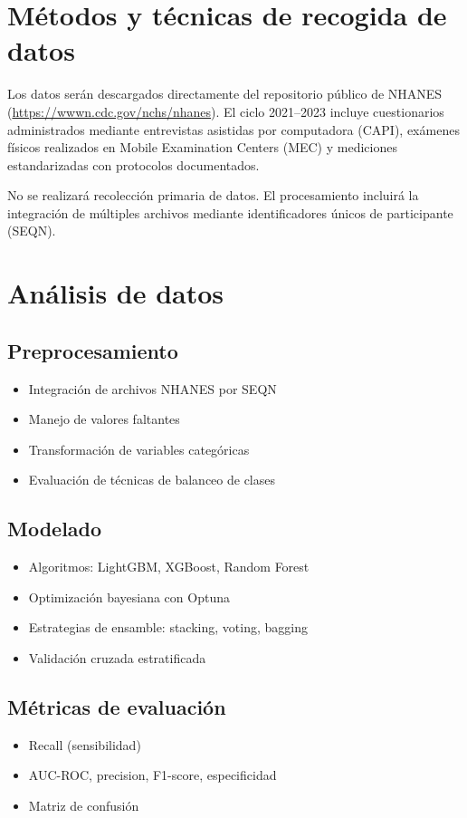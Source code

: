 \documentclass[12pt, a4paper]{report}
\begin{document}
\section{Métodos y técnicas de recogida de datos}

Los datos serán descargados directamente del repositorio público de NHANES (\url{https://wwwn.cdc.gov/nchs/nhanes}). El ciclo 2021--2023 incluye cuestionarios administrados mediante entrevistas asistidas por computadora (CAPI), exámenes físicos realizados en Mobile Examination Centers (MEC) y mediciones estandarizadas con protocolos documentados.

No se realizará recolección primaria de datos. El procesamiento incluirá la integración de múltiples archivos mediante identificadores únicos de participante (SEQN).

\section{Análisis de datos}

\subsection*{Preprocesamiento}
\begin{itemize}
    \item Integración de archivos NHANES por SEQN
    \item Manejo de valores faltantes
    \item Transformación de variables categóricas
    \item Evaluación de técnicas de balanceo de clases
\end{itemize}

\subsection*{Modelado}
\begin{itemize}
    \item Algoritmos: LightGBM, XGBoost, Random Forest
    \item Optimización bayesiana con Optuna
    \item Estrategias de ensamble: stacking, voting, bagging
    \item Validación cruzada estratificada
\end{itemize}

\subsection*{Métricas de evaluación}
\begin{itemize}
    \item Recall (sensibilidad)
    \item AUC-ROC, precision, F1-score, especificidad
    \item Matriz de confusión
\end{itemize}
\end{document}
